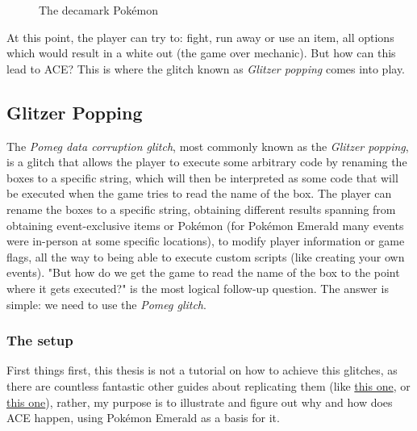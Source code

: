 \documentclass[a4paper]{usiinfbachelorproject}
\begin{document}
\begin{figure}[h!]
	\caption{The decamark Pokémon}\label{fig:decamark}
\end{figure}

At this point, the player can try to: fight, run away or use an item, all options which would result in a white out (the game over mechanic). But how can this lead to ACE? This is where the glitch known as \textit{Glitzer popping} comes into play.

\subsection{\textbf{Glitzer Popping}}
The \textit{Pomeg data corruption glitch}, most commonly known as the \textit{Glitzer popping}, is a glitch that allows the player to execute some arbitrary code by renaming the boxes to a specific string, which will then be interpreted as some code that will be executed when the game tries to read the name of the box. The player can rename the boxes to a specific string, obtaining different results spanning from obtaining event-exclusive items or Pokémon (for Pokémon Emerald many events were in-person at some specific locations), to modify player information or game flags, all the way to being able to execute custom scripts (like creating your own events). "But how do we get the game to read the name of the box to the point where it gets executed?" is the most logical follow-up question. The answer is simple: we need to use the \textit{Pomeg glitch}.


\subsubsection{\textbf{The setup}}
First things first, this thesis is not a tutorial on how to achieve this glitches, as there are countless fantastic other guides about replicating them (like \href{https://www.youtube.com/watch?v=45kwOEhKbUg}{this one}, or \href{https://e-sh4rk.github.io/ACE3/}{this one}), rather, my purpose is to illustrate and figure out why and how does ACE happen, using Pokémon Emerald as a basis for it.
\end{document}
